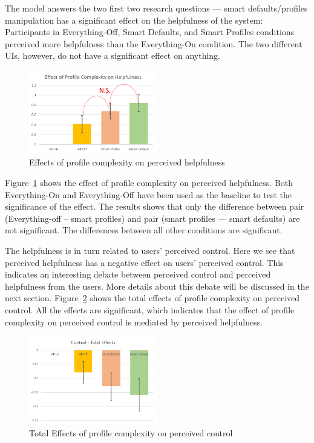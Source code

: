 The model answers the two first two research questions --- smart defaults/profiles manipulation has a significant effect on the helpfulness of the system: Participants in Everything-Off, Smart Defaults, and Smart Profiles conditions perceived more helpfulness than the Everything-On condition. The two different UIs, however, do not have a significant effect on anything.

\begin{figure}
	\centering
	\includegraphics[width=0.5\textwidth]{figures/effectonhelpfulness.png}
	\caption{Effects of profile complexity on perceived helpfulness}
	\label{fig:effectonhelpfulness}
\end{figure}

Figure~\ref{fig:effectonhelpfulness} shows the effect of profile complexity on perceived helpfulness. Both Everything-On and Everything-Off have been used as the baseline to test the significance of the effect. The results shows that only the difference between pair (Everything-off -- smart profiles) and pair (smart profiles --- smart defaults) are not significant. The differences between all other conditions are significant.

The helpfulness is in turn related to users' perceived control. Here we see that perceived helpfulness has a negative effect on users' perceived control. This indicates an interesting debate between perceived control and perceived helpfulness from the users. More details about this debate will be discussed in the next section. Figure~\ref{fig:effectoncontrol} shows the total effects of profile complexity on perceived control. All the effects are significant, which indicates that the effect of profile complexity on perceived control is mediated by perceived helpfulness. 

\begin{figure}[ht]
	\centering
	\includegraphics[width=0.5\textwidth]{figures/effectoncontrol.png}
	\caption{Total Effects of profile complexity on perceived control}
	\label{fig:effectoncontrol}
\end{figure}

